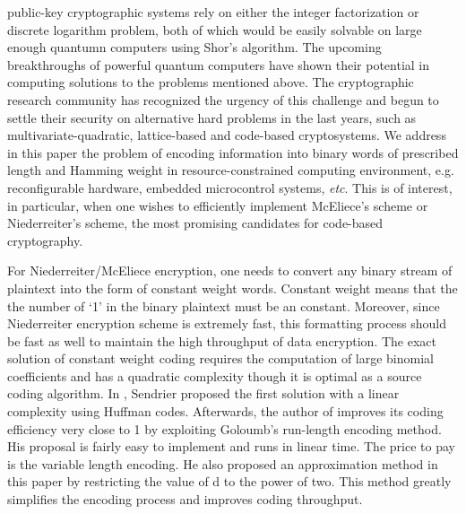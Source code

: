 \documentclass[10pt,journal,compsoc]{IEEEtran}
\begin{document}
%
%
%
%
 public-key cryptographic systems rely on either the integer factorization
or discrete logarithm problem, both of which would be easily solvable on large enough quantumn computers
using Shor's algorithm\cite{shor1997polynomial}. The upcoming breakthroughs of powerful quantum computers  have shown
their potential in computing solutions to the problems mentioned above\cite{vandersypen2001experimental,xu2011quantum}. The cryptographic research
community has recognized the urgency of this challenge and begun to settle their security on alternative hard problems
in the last years, such as multivariate-quadratic, lattice-based and code-based cryptosystems\cite{bernstein2009introduction}. We address in this paper
the problem of encoding information into binary words of prescribed length and Hamming weight in resource-constrained
computing environment, e.g. reconfigurable hardware, embedded microcontrol systems, \textit{etc}. This is of interest,
in particular, when one wishes to efficiently implement McEliece's scheme\cite{mceliece1978public,sendrier2014code} or Niederreiter's scheme\cite{niederreiter1986knapsack},  the most promising candidates for code-based cryptography.

For Niederreiter/McEliece encryption, one needs to convert any binary
stream of plaintext into the form of constant weight words. Constant weight means that the
the number of `1' in the binary plaintext must be an constant. Moreover, since Niederreiter encryption
scheme is extremely fast, this formatting process should be fast as well to maintain the high throughput of data encryption.
The exact solution \cite{cover1973enumerative} of constant weight coding requires the computation of large binomial coefficients and
has a quadratic complexity though it is optimal as a source coding algorithm.
In \cite{sendrier1995efficient}, Sendrier proposed the first solution with a linear complexity using Huffman codes. Afterwards,
the author of \cite{sendrier1995efficient} improves its
coding efficiency very close to 1 by exploiting Goloumb's run-length encoding method\cite{goloumb1966run}.
His proposal is fairly easy to implement and runs in linear time.
The price to pay is the variable length encoding\cite{sendrier2005encoding}. He also proposed an approximation method in this paper
by restricting the value of d to the power of two. This method greatly simplifies the encoding process and
improves coding throughput.
\end{document}

